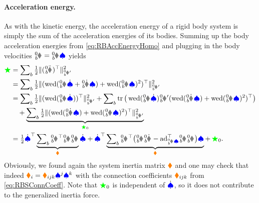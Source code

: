 \paragraph{Acceleration energy.}
As with the kinetic energy, the acceleration energy of a rigid body system is simply the sum of the acceleration energies of its bodies.
Summing up the body acceleration energies from \eqref{eq:RBAccEnergyHomo} and plugging in the body velocities $\bodyVel{0}{\BidxII} = \bodyJac{0}{\BidxII} \sysVel$ yields
\begin{align}\label{eq:RBSAccEnergy}
 \accEnergy
 &= \sumBodies \tfrac{1}{2} \norm[\bodyInertiaMatp{0}{\BidxII}]{(\bodyHomoCoorddd{0}{\BidxII})^\top}^2
\nonumber\\
 &= \sumBodies \tfrac{1}{2} \norm[\bodyInertiaMatp{0}{\BidxII}]{(\wedOp(\bodyJac{0}{\BidxII} \sysVeld + \bodyJacd{0}{\BidxII} \sysVel) + \wedOp(\bodyJac{0}{\BidxII} \sysVel)^2)^\top}^2
\nonumber\\
 &= \sumBodies \tfrac{1}{2} \norm[\bodyInertiaMatp{0}{\BidxII}]{(\wedOp(\bodyJac{0}{\BidxII} \sysVeld))^\top}^2
 + \sumBodies \tr\big( \wedOp(\bodyJac{0}{\BidxII} \sysVeld) \bodyInertiaMatp{0}{\BidxII} (\wedOp(\bodyJacd{0}{\BidxII} \sysVel) + \wedOp(\bodyJac{0}{\BidxII} \sysVel)^2)^\top \big)
\nonumber\\
 &\quad + \underbrace{\sumBodies \tfrac{1}{2} \norm[\bodyInertiaMatp{0}{\BidxII}]{(\wedOp(\bodyJacd{0}{\BidxII} \sysVel) + \wedOp(\bodyJac{0}{\BidxII} \sysVel)^2)^\top}^2}_{\accEnergy_0}
\nonumber\\
 &= \tfrac{1}{2} \sysVeld^\top \underbrace{\sumBodies \bodyJac{0}{\BidxII}^\top \bodyInertiaMat{0}{\BidxII} \bodyJac{0}{\BidxII}}_{\sysInertiaMat} \sysVeld
 + \sysVeld^\top \underbrace{\sumBodies \bodyJac{0}{\BidxII}^\top \big(\bodyInertiaMat{0}{\BidxII} \bodyJacd{0}{\BidxII} - \ad{\bodyJac{0}{\BidxII}\sysVel}^\top \bodyInertiaMat{0}{\BidxII}\bodyJac{0}{\BidxII} \big) \sysVel}_{\gyroForce}
 + \, \accEnergy_0.
\end{align}
Obviously, we found again the system inertia matrix $\boldsymbol{\textcolor{orange}{\blacklozenge}}$ and one may check that indeed $\textcolor{orange}{\blacklozenge}_{i} = \textcolor{orange}{\blacklozenge}_{ijk} \textcolor{blue}{\spadesuit}^{j} \textcolor{blue}{\spadesuit}^{k}$ with the connection coefficients $\textcolor{orange}{\blacklozenge}_{ijk}$ from \eqref{eq:RBSConnCoeff}.
Note that $\textcolor{green}{\bigstar}_0$ is independent of $\dot{\boldsymbol{\textcolor{blue}{\spadesuit}}}$, so it does not contribute to the generalized inertia force.

